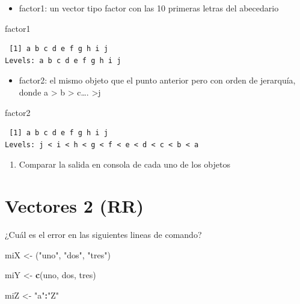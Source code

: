 \documentclass[]{book}
\newenvironment{Shaded}{\begin{snugshade}}{\end{snugshade}}
\newcommand{\KeywordTok}[1]{\textcolor[rgb]{0.13,0.29,0.53}{\textbf{#1}}}
\newcommand{\NormalTok}[1]{#1}
\newcommand{\OperatorTok}[1]{\textcolor[rgb]{0.81,0.36,0.00}{\textbf{#1}}}
\newcommand{\StringTok}[1]{\textcolor[rgb]{0.31,0.60,0.02}{#1}}
\providecommand{\tightlist}{%
  \setlength{\itemsep}{0pt}\setlength{\parskip}{0pt}}
\begin{document}
\begin{itemize}
\tightlist
\item
  factor1: un vector tipo factor con las 10 primeras letras del abecedario
\end{itemize}

\begin{Shaded}
\begin{Highlighting}[]
\NormalTok{factor1}
\end{Highlighting}
\end{Shaded}

\begin{verbatim}
 [1] a b c d e f g h i j
Levels: a b c d e f g h i j
\end{verbatim}

\begin{itemize}
\tightlist
\item
  factor2: el mismo objeto que el punto anterior pero con orden de jerarquía, donde a \textgreater{} b \textgreater{} c\ldots{}. \textgreater{}j
\end{itemize}

\begin{Shaded}
\begin{Highlighting}[]
\NormalTok{factor2}
\end{Highlighting}
\end{Shaded}

\begin{verbatim}
 [1] a b c d e f g h i j
Levels: j < i < h < g < f < e < d < c < b < a
\end{verbatim}

\begin{enumerate}
\def\labelenumi{\arabic{enumi}.}
\setcounter{enumi}{1}
\tightlist
\item
  Comparar la salida en consola de cada uno de los objetos
\end{enumerate}

\hypertarget{vectores-2-rr}{%
\section{Vectores 2 (RR)}\label{vectores-2-rr}}

¿Cuál es el error en las siguientes lineas de comando?

\begin{Shaded}
\begin{Highlighting}[]
\NormalTok{miX <-}\StringTok{ }\NormalTok{(}\StringTok{"uno"}\NormalTok{, }\StringTok{"dos"}\NormalTok{, }\StringTok{"tres"}\NormalTok{)}

\NormalTok{miY <-}\StringTok{ }\KeywordTok{c}\NormalTok{(uno, dos, tres)}

\NormalTok{miZ <-}\StringTok{ "a"}\OperatorTok{:}\StringTok{"Z"}
\end{Highlighting}
\end{Shaded}
\end{document}
